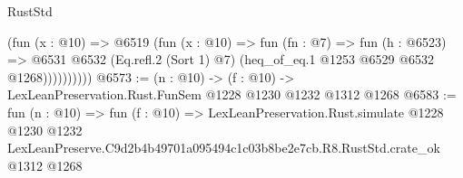 \begin{lexlean}{RustStd}
\begin{coremodule}
                  (fun (x : @10) =>
                  @6519
                    (fun (x : @10) =>
                    fun (fn : @7) =>
                    fun (h : @6523) =>
                    @6531
                      @6532
                      (Eq.refl.{2} (Sort 1) @7)
                      (heq_of_eq.{1} @1253 @6529 @6532 @1268))))))))))
@6573 := (n : @10) -> (f : @10) -> LexLeanPreservation.Rust.FunSem @1228 @1230 @1232 @1312 @1268
@6583 := fun (n : @10) =>
  fun (f : @10) =>
  LexLeanPreservation.Rust.simulate
    @1228
    @1230
    @1232
    LexLeanPreserve.C9d2b4b49701a095494c1c03b8be2e7cb.R8.RustStd.crate_ok
    @1312
    @1268
\end{coremodule}
\end{lexlean}
